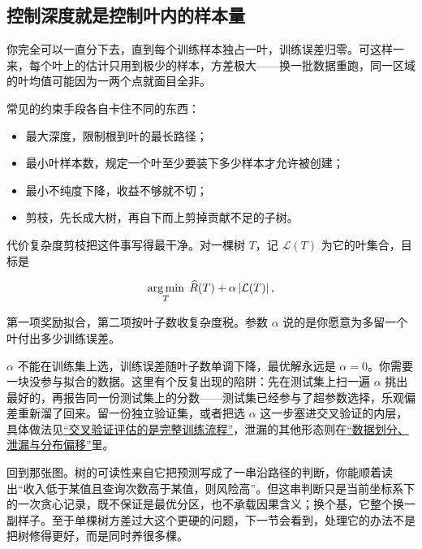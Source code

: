 \subsection{控制深度就是控制叶内的样本量}

你完全可以一直分下去，直到每个训练样本独占一叶，训练误差归零。可这样一来，每个叶上的估计只用到极少的样本，方差极大——换一批数据重跑，同一区域的叶均值可能因为一两个点就面目全非。

常见的约束手段各自卡住不同的东西：

\begin{itemize}
\tightlist
\item
  最大深度，限制根到叶的最长路径；
\item
  最小叶样本数，规定一个叶至少要装下多少样本才允许被创建；
\item
  最小不纯度下降，收益不够就不切；
\item
  剪枝，先长成大树，再自下而上剪掉贡献不足的子树。
\end{itemize}

代价复杂度剪枝把这件事写得最干净。对一棵树 \(T\)，记 \(\mathcal L(T)\) 为它的叶集合，目标是

\[
\operatorname*{arg\,min}_{T} \; \widehat R(T) + \alpha\left|\mathcal L(T)\right| ,
\]

第一项奖励拟合，第二项按叶子数收复杂度税。参数 \(\alpha\) 说的是你愿意为多留一个叶付出多少训练误差。

\(\alpha\) 不能在训练集上选，训练误差随叶子数单调下降，最优解永远是 \(\alpha=0\)。你需要一块没参与拟合的数据。这里有个反复出现的陷阱：先在测试集上扫一遍 \(\alpha\) 挑出最好的，再报告同一份测试集上的分数——测试集已经参与了超参数选择，乐观偏差重新溜了回来。留一份独立验证集，或者把选 \(\alpha\) 这一步塞进交叉验证的内层，具体做法见\hyperref[sec:11-Mathematical-Statistics/06-Resampling-and-Model-Selection/03]{``交叉验证评估的是完整训练流程''}，泄漏的其他形态则在\hyperref[sec:13-Machine-Learning/01-Learning-Problems-and-Evaluation/04]{``数据划分、泄漏与分布偏移''}里。

回到那张图。树的可读性来自它把预测写成了一串沿路径的判断，你能顺着读出``收入低于某值且查询次数高于某值，则风险高''。但这串判断只是当前坐标系下的一次贪心记录，既不保证是最优分区，也不承载因果含义；换个基，它整个换一副样子。至于单棵树方差过大这个更硬的问题，下一节会看到，处理它的办法不是把树修得更好，而是同时养很多棵。
